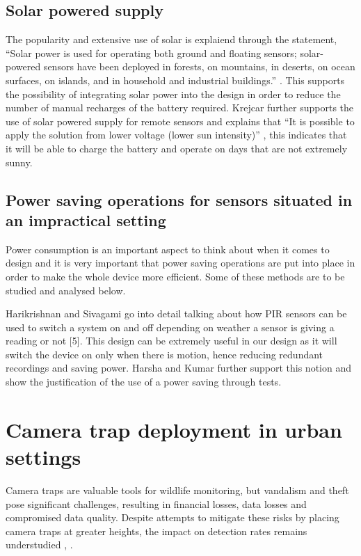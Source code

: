 \documentclass[class=report,11pt,crop=false]{standalone}
\begin{document}
\subsection{Solar powered supply}

The popularity and extensive use of solar is explaiend through the statement, “Solar power is used for operating both ground and floating sensors; solar-powered sensors have been deployed in forests, on mountains, in deserts, on ocean surfaces, on islands, and in household and industrial buildings.” \cite{dewan2014alternative}. This supports the possibility of integrating solar power into the design in order to reduce the number of manual recharges of the battery required. Krejcar further supports the use of solar powered supply for remote sensors and explains that “It is possible to apply the solution from lower voltage (lower sun intensity)” \cite{krejcar2012optimized}, this indicates that it will be able to charge the battery and operate on days that are not extremely sunny.

\subsection{Power saving operations for sensors situated in an impractical setting}

Power consumption is an important aspect to think about when it comes to design and it is very important that power saving operations are put into place in order to make the whole device more efficient. Some of these methods are to be studied and analysed below.

Harikrishnan and Sivagami \cite{harikirshnan2017intelligent} go into detail talking about how PIR sensors can be used to switch a system on and off depending on weather a sensor is giving a reading or not [5]. This design can be extremely useful in our design as it will switch the device on only when there is motion, hence reducing redundant recordings and saving power. Harsha and Kumar \cite{harsha2020home} further support this notion and show the justification of the use of a power saving through tests.


\section{Camera trap deployment in urban settings} 

Camera traps are valuable tools for wildlife monitoring, but vandalism and theft pose significant challenges, resulting in financial losses, data losses and compromised data quality. Despite attempts to mitigate these risks by placing camera traps at greater heights, the impact on detection rates remains understudied \cite{meek2016higher}, \cite{meek2019camera}.
\end{document}
